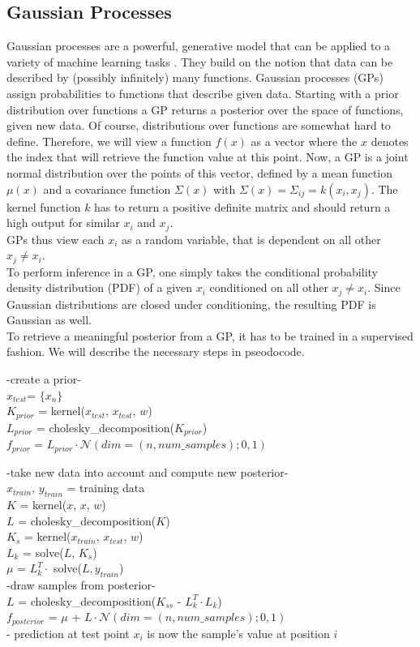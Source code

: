 \documentclass[a4paper,cleardoubleempty,BCOR1cm, 11pt]{report}
\begin{document}
\subsection{Gaussian Processes}\label{sec:gp}
Gaussian processes are a powerful, generative model that can be applied to a variety of machine learning tasks \cite{mackay1998introduction}. They build on the notion that data can be described by (possibly infinitely) many functions. Gaussian processes (GPs) assign probabilities to functions that describe given data. Starting with a prior distribution over functions a GP returns a posterior over the space of functions, given new data. Of course, distributions over functions are somewhat hard to define. Therefore, we will view a function $f(x)$ as a vector where the $x$ denotes the index that will retrieve the function value at this point. Now, a GP is a joint normal distribution over the points of this vector, defined by a mean function $\mu(x)$ and a covariance function $\Sigma(x)$ with $\Sigma(x) = \Sigma_{ij} = k(x_i,x_j)$. The kernel function $k$ has to return a positive definite matrix and should return a high output for similar $x_i$ and $x_j$.\\
GPs thus view each $x_i$ as a random variable, that is dependent on all other $x_j\neq x_i$.\\
To perform inference in a GP, one simply takes the conditional probability density distribution (PDF) of a given $x_i$ conditioned on all other $x_j\neq x_i$. Since Gaussian distributions are closed under conditioning, the resulting PDF is Gaussian as well.\\
To retrieve a meaningful posterior from a GP, it has to be trained in a supervised fashion. We will describe the necessary steps in pseodocode.
\begin{algorithm}[ht]
-create a prior-\\
$x_{test}$= $\lbrace x_n \rbrace$\\
$K_{prior}$ = kernel($x_{test}$, $x_{test}$, $w$)\\
$L_{prior}$ = cholesky\_decomposition($K_{prior}$)\\ %
$f_{prior}$ = $L_{prior} \cdot \mathcal{N}(dim=(n, num\_samples);0,1)$

-take new data into account and compute new posterior-\\
$x_{train}$, $y_{train}$ = training data\\
$K$ = kernel($x$, $x$, $w$)\\
$L$ = cholesky\_decomposition($K$)\\
$K_s$ = kernel($x_{train}$, $x_{test}$, $w$)\\
$L_k$ = solve($L$, $K_s$)\\
$\mu$ = $L_k^T \cdot$ solve($L, y_{train}$)\\

-draw samples from posterior-\\
$L$ = cholesky\_decomposition($K_{ss}$ - $L_k^T \cdot L_k$)\\
$f_{posterior}$ = $\mu$ + $L \cdot \mathcal{N}(dim=(n, num\_samples);0,1)$\\
- prediction at test point $x_i$ is now the sample's value at position $i$
\end{algorithm}
\end{document}

